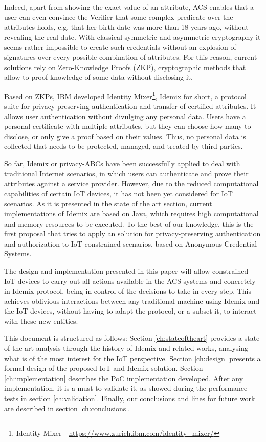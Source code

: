 Indeed, apart from showing the exact value of an attribute, ACS enables that a user can even convince the Verifier that some complex predicate over the attributes holds, e.g. that her birth date was more than 18 years ago, without revealing the real date. With classical symmetric and asymmetric cryptography it seems rather impossible to create such credentials without an explosion of signatures over every possible combination of attributes. For this reason, current solutions rely on  Zero-Knowledge Proofs (ZKP), cryptographic methods that allow to proof knowledge of some data without disclosing it.

Based on ZKPs, IBM developed Identity Mixer\footnote{Identity Mixer - \url{https://www.zurich.ibm.com/identity_mixer/}}, %
Idemix for short, a protocol suite for privacy-preserving authentication and transfer of certified attributes. It allows user authentication without divulging any personal data. Users have a personal certificate with multiple attributes, but they can choose how many to disclose, or only give a proof based on their values. Thus, no personal data is collected that needs to be protected, managed, and treated by third parties.

So far, Idemix or privacy-ABCs have been successfully applied to deal with traditional Internet scenarios, in which users can authenticate and prove their attributes against a service provider. However, due to the reduced computational capabilities of certain IoT devices, it has not been yet considered for IoT scenarios. As it is presented in the state of the art section, current implementations of Idemix are based on Java, which requires high computational and memory resources to be executed. To the best of our knowledge, this is the first proposal that tries to apply an solution for privacy-preserving authentication and authorization to IoT constrained scenarios, based on Anonymous Credential Systems.

The design and implementation presented in this paper will allow constrained IoT devices to carry out all actions available in the ACS systems and concretely in Idemix protocol, being in control of the decisions to take in every step. This achieves oblivious interactions between any traditional machine using Idemix and the IoT devices, without having to adapt the protocol, or a subset it, to interact with these new entities.

\hfil

This document is structured as follows: Section \ref{ch:stateoftheart} provides a state of the art analysis through the history of Idemix and related works, analysing what is of the most interest for the IoT perspective. Section \ref{ch:design} presents a formal design of the proposed IoT and Idemix solution. Section \ref{ch:implementation} describes the PoC implementation developed. After any implementation, it is a must to validate it, as showed during the performance tests in section \ref{ch:validation}. Finally, our conclusions and lines for future work are described in section \ref{ch:conclusions}.
